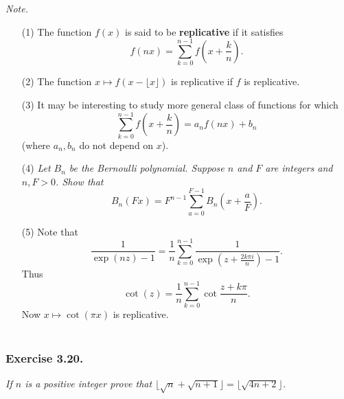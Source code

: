\documentclass{article}
\begin{document}
\emph{Note.}
\begin{enumerate}
\item[(1)]
  The function $f(x)$ is said to be \textbf{replicative} if it satisfies
  \[
    f(nx) = \sum_{k=0}^{n-1} f\left( x+\frac{k}{n} \right).
  \]

\item[(2)]
  The function $x \mapsto f(x - \lfloor x \rfloor)$ is replicative if $f$ is replicative.

\item[(3)]
  It may be interesting to study more general class of functions for which
  \[
    \sum_{k=0}^{n-1} f\left( x+\frac{k}{n} \right) = a_n f(nx) + b_n
  \]
  (where $a_n, b_n$ do not depend on $x$).

\item[(4)]
  \emph{Let $B_n$ be the Bernoulli polynomial.
  Suppose $n$ and $F$ are integers and $n, F > 0$. Show that}
  \[
    B_n(Fx) = F^{n-1} \sum_{a=0}^{F-1} B_n \left(x + \frac{a}{F} \right).
  \]

\item[(5)]
  Note that
  \[
    \frac{1}{\exp(nz) - 1}
    = \frac{1}{n} \sum_{k=0}^{n-1} \frac{1}{\exp(z + \frac{2 k \pi i}{n}) - 1}.
  \]
  Thus
  \[
    \cot(z) = \frac{1}{n} \sum_{k=0}^{n-1} \cot\frac{z + k\pi}{n}.
  \]
  Now $x \mapsto \cot(\pi x)$ is replicative. \\\\
\end{enumerate}






\subsubsection*{Exercise 3.20.}
\emph{If $n$ is a positive integer prove that
$\lfloor \sqrt{n} + \sqrt{n+1} \rfloor = \lfloor \sqrt{4n+2} \rfloor$.} \\
\end{document}
